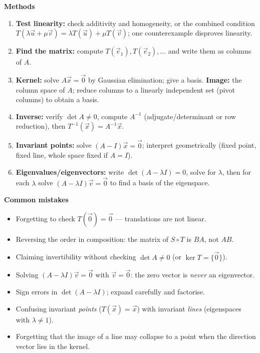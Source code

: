 \documentclass[11pt]{article}
\begin{document}
\begin{aretenir}
\textbf{Methods}
\begin{enumerate}
\item \textbf{Test linearity:} check additivity and homogeneity, or the combined condition $T(\lambda\vec{u}+\mu\vec{v})=\lambda T(\vec{u})+\mu T(\vec{v})$; one counterexample disproves linearity.
\item \textbf{Find the matrix:} compute $T(\vec{e}_1),T(\vec{e}_2),\dots$ and write them as columns of $A$.
\item \textbf{Kernel:} solve $A\vec{x}=\vec{0}$ by Gaussian elimination; give a basis. \textbf{Image:} the column space of $A$; reduce columns to a linearly independent set (pivot columns) to obtain a basis.
\item \textbf{Inverse:} verify $\det A\neq 0$, compute $A^{-1}$ (adjugate/determinant or row reduction), then $T^{-1}(\vec{x})=A^{-1}\vec{x}$.
\item \textbf{Invariant points:} solve $(A-I)\vec{x}=\vec{0}$; interpret geometrically (fixed point, fixed line, whole space fixed if $A=I$).
\item \textbf{Eigenvalues/eigenvectors:} write $\det(A-\lambda I)=0$, solve for $\lambda$, then for each $\lambda$ solve $(A-\lambda I)\vec{v}=\vec{0}$ to find a basis of the eigenspace.
\end{enumerate}

\textbf{Common mistakes}
\begin{itemize}
\item Forgetting to check $T(\vec{0})=\vec{0}$ — translations are not linear.
\item Reversing the order in composition: the matrix of $S\circ T$ is $BA$, not $AB$.
\item Claiming invertibility without checking $\det A\neq 0$ (or $\ker T=\{\vec{0}\}$).
\item Solving $(A-\lambda I)\vec{v}=\vec{0}$ with $\vec{v}=\vec{0}$: the zero vector is \emph{never} an eigenvector.
\item Sign errors in $\det(A-\lambda I)$; expand carefully and factorise.
\item Confusing invariant \emph{points} ($T(\vec{x})=\vec{x}$) with invariant \emph{lines} (eigenspaces with $\lambda\neq 1$).
\item Forgetting that the image of a line may collapse to a point when the direction vector lies in the kernel.
\end{itemize}


\end{aretenir}
\end{document}

